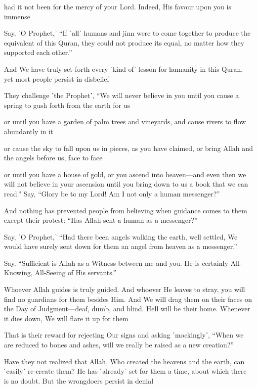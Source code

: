 had it not been for the mercy of your Lord. Indeed, His favour upon you is immense

Say, ˹O Prophet,˺ “If ˹all˺ humans and jinn were to come together to produce the equivalent of this Quran, they could not produce its equal, no matter how they supported each other.”

And We have truly set forth every ˹kind of˺ lesson for humanity in this Quran, yet most people persist in disbelief

They challenge ˹the Prophet˺, “We will never believe in you until you cause a spring to gush forth from the earth for us

or until you have a garden of palm trees and vineyards, and cause rivers to flow abundantly in it

or cause the sky to fall upon us in pieces, as you have claimed, or bring Allah and the angels before us, face to face

or until you have a house of gold, or you ascend into heaven—and even then we will not believe in your ascension until you bring down to us a book that we can read.” Say, “Glory be to my Lord! Am I not only a human messenger?”

And nothing has prevented people from believing when guidance comes to them except their protest: “Has Allah sent a human as a messenger?”

Say, ˹O Prophet,˺ “Had there been angels walking the earth, well settled, We would have surely sent down for them an angel from heaven as a messenger.”

Say, “Sufficient is Allah as a Witness between me and you. He is certainly All-Knowing, All-Seeing of His servants.”

Whoever Allah guides is truly guided. And whoever He leaves to stray, you will find no guardians for them besides Him. And We will drag them on their faces on the Day of Judgment—deaf, dumb, and blind. Hell will be their home. Whenever it dies down, We will flare it up for them

That is their reward for rejecting Our signs and asking ˹mockingly˺, “When we are reduced to bones and ashes, will we really be raised as a new creation?”

Have they not realized that Allah, Who created the heavens and the earth, can ˹easily˺ re-create them? He has ˹already˺ set for them a time, about which there is no doubt. But the wrongdoers persist in denial


